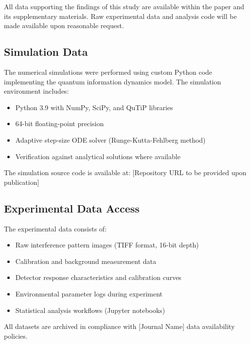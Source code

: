 \documentclass[12pt,letterpaper]{article}
\begin{document}
All data supporting the findings of this study are available within the paper and its supplementary materials. Raw experimental data and analysis code will be made available upon reasonable request.

\subsection{Simulation Data}

The numerical simulations were performed using custom Python code implementing the quantum information dynamics model. The simulation environment includes:

\begin{itemize}
\item Python 3.9 with NumPy, SciPy, and QuTiP libraries
\item 64-bit floating-point precision
\item Adaptive step-size ODE solver (Runge-Kutta-Fehlberg method)
\item Verification against analytical solutions where available
\end{itemize}

The simulation source code is available at: [Repository URL to be provided upon publication]

\subsection{Experimental Data Access}

The experimental data consists of:

\begin{itemize}
\item Raw interference pattern images (TIFF format, 16-bit depth)
\item Calibration and background measurement data
\item Detector response characteristics and calibration curves
\item Environmental parameter logs during experiment
\item Statistical analysis workflows (Jupyter notebooks)
\end{itemize}

All datasets are archived in compliance with [Journal Name] data availability policies.
\end{document}
